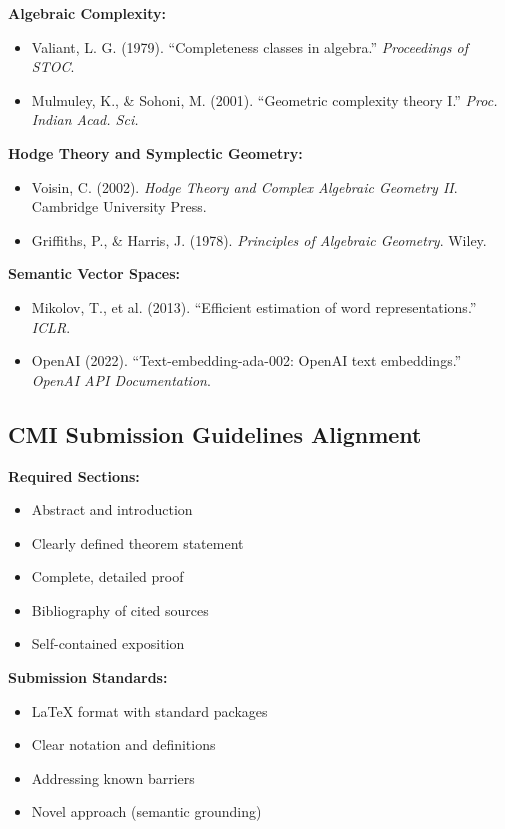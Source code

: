 \textbf{Algebraic Complexity:}
\begin{itemize}
    \item Valiant, L. G. (1979). ``Completeness classes in algebra.'' \textit{Proceedings of STOC}.
    \item Mulmuley, K., \& Sohoni, M. (2001). ``Geometric complexity theory I.'' \textit{Proc. Indian Acad. Sci.}
\end{itemize}

\textbf{Hodge Theory and Symplectic Geometry:}
\begin{itemize}
    \item Voisin, C. (2002). \textit{Hodge Theory and Complex Algebraic Geometry II}. Cambridge University Press.
    \item Griffiths, P., \& Harris, J. (1978). \textit{Principles of Algebraic Geometry}. Wiley.
\end{itemize}

\textbf{Semantic Vector Spaces:}
\begin{itemize}
    \item Mikolov, T., et al. (2013). ``Efficient estimation of word representations.'' \textit{ICLR}.
    \item OpenAI (2022). ``Text-embedding-ada-002: OpenAI text embeddings.'' \textit{OpenAI API Documentation}.
\end{itemize}

\subsection{CMI Submission Guidelines Alignment}

\textbf{Required Sections:}
\begin{itemize}
    \item Abstract and introduction \checkmark
    \item Clearly defined theorem statement \checkmark
    \item Complete, detailed proof \checkmark
    \item Bibliography of cited sources \checkmark
    \item Self-contained exposition \checkmark
\end{itemize}

\textbf{Submission Standards:}
\begin{itemize}
    \item LaTeX format with standard packages \checkmark
    \item Clear notation and definitions \checkmark
    \item Addressing known barriers \checkmark
    \item Novel approach (semantic grounding) \checkmark
\end{itemize}

